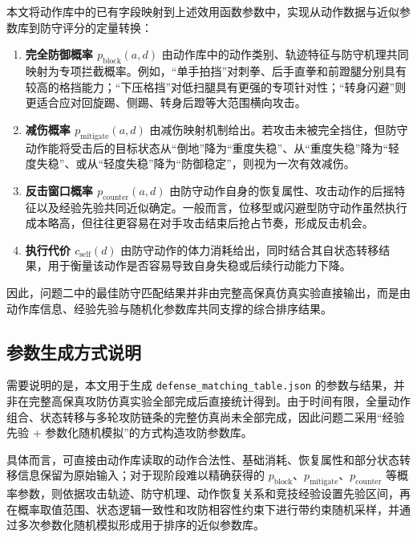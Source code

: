 本文将动作库中的已有字段映射到上述效用函数参数中，实现从动作数据与近似参数库到防守评分的定量转换：

\begin{enumerate}
    \item \textbf{完全防御概率 \(p_{\text{block}}(a,d)\)}  
    由动作库中的动作类别、轨迹特征与防守机理共同映射为专项拦截概率。例如，“单手拍挡”对刺拳、后手直拳和前蹬腿分别具有较高的格挡能力；“下压格挡”对低扫腿具有更强的专项针对性；“转身闪避”则更适合应对回旋踢、侧踢、转身后蹬等大范围横向攻击。

    \item \textbf{减伤概率 \(p_{\text{mitigate}}(a,d)\)}  
    由减伤映射机制给出。若攻击未被完全挡住，但防守动作能将受击后的目标状态从“倒地”降为“重度失稳”、从“重度失稳”降为“轻度失稳”、或从“轻度失稳”降为“防御稳定”，则视为一次有效减伤。

    \item \textbf{反击窗口概率 \(p_{\text{counter}}(a,d)\)}  
    由防守动作自身的恢复属性、攻击动作的后摇特征以及经验先验共同近似确定。一般而言，位移型或闪避型防守动作虽然执行成本略高，但往往更容易在对手攻击结束后抢占节奏，形成反击机会。

    \item \textbf{执行代价 \(c_{\text{self}}(d)\)}  
    由防守动作的体力消耗给出，同时结合其自状态转移结果，用于衡量该动作是否容易导致自身失稳或后续行动能力下降。
\end{enumerate}

因此，问题二中的最佳防守匹配结果并非由完整高保真仿真实验直接输出，而是由动作库信息、经验先验与随机化参数库共同支撑的综合排序结果。

\subsection{参数生成方式说明}

需要说明的是，本文用于生成 \texttt{defense\_matching\_table.json} 的参数与结果，并非在完整高保真攻防仿真实验全部完成后直接统计得到。由于时间有限，全量动作组合、状态转移与多轮攻防链条的完整仿真尚未全部完成，因此问题二采用“经验先验 + 参数化随机模拟”的方式构造攻防参数库。

具体而言，可直接由动作库读取的动作合法性、基础消耗、恢复属性和部分状态转移信息保留为原始输入；对于现阶段难以精确获得的 \(p_{\text{block}}\)、\(p_{\text{mitigate}}\)、\(p_{\text{counter}}\) 等概率参数，则依据攻击轨迹、防守机理、动作恢复关系和竞技经验设置先验区间，再在概率取值范围、状态逻辑一致性和攻防相容性约束下进行带约束随机采样，并通过多次参数化随机模拟形成用于排序的近似参数库。

